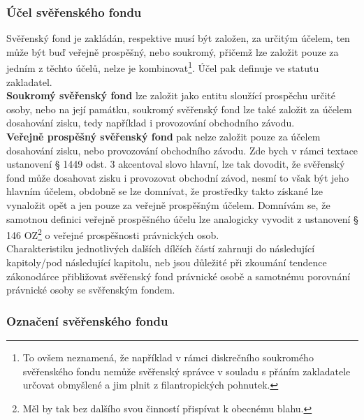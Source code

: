 \documentclass{article}
\begin{document}
\subsubsection{Účel svěřenského fondu}

Svěřenský fond je zakládán, respektive musí být založen, za určitým účelem, ten může být buď veřejně prospěšný, nebo soukromý, přičemž lze založit pouze za jedním z těchto účelů, nelze je kombinovat\footnote{To ovšem neznamená, že například v rámci diskrečního soukromého svěřenského fondu nemůže svěřenský správce v souladu s přáním zakladatele určovat obmyšlené a jim plnit z filantropických pohnutek.}. Účel pak definuje ve statutu zakladatel.\\

\textbf{Soukromý svěřenský fond} lze založit jako entitu sloužící prospěchu určité osoby, nebo na její památku, soukromý svěřenský fond lze také založit za účelem dosahování zisku, tedy například i provozování obchodního závodu.\\

\textbf{Veřejně prospěšný svěřenský fond} pak nelze založit pouze za účelem dosahování zisku, nebo provozování obchodního závodu. Zde bych v rámci textace ustanovení § 1449 odst. 3 akcentoval slovo hlavní, lze tak dovodit, že svěřenský fond může dosahovat zisku i provozovat obchodní závod, nesmí to však být jeho hlavním účelem, obdobně se lze domnívat, že prostředky takto získané lze vynaložit opět a jen pouze za veřejně prospěšným účelem. Domnívám se, že samotnou definici veřejně prospěšného účelu lze analogicky vyvodit z ustanovení § 146 OZ\footnote{Měl by tak bez dalšího svou činností přispívat k obecnému blahu.} o veřejné prospěšnosti právnických osob.\\

Charakteristiku jednotlivých dalších dílčích částí zahrnuji do následující kapitoly/pod následující kapitolu, neb jsou důležité při zkoumání tendence zákonodárce přibližovat svěřenský fond právnické osobě a samotnému porovnání právnické osoby se svěřenským fondem.\\

\subsubsection{Označení svěřenského fondu}
\end{document}
